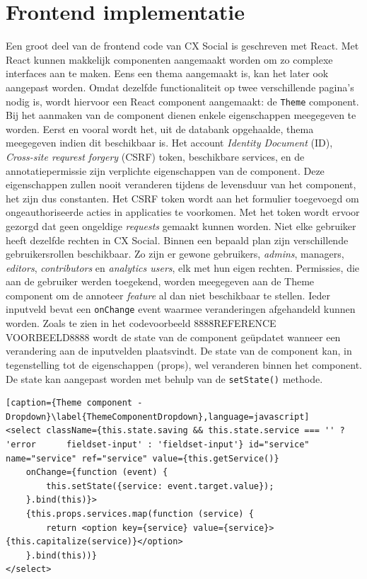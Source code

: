 \section{Frontend implementatie}
Een groot deel van de frontend code van CX Social is geschreven met React. Met React kunnen makkelijk componenten aangemaakt worden om zo complexe interfaces aan te maken. %
Eens een thema aangemaakt is, kan het later ook aangepast worden. Omdat dezelfde functionaliteit op twee verschillende pagina's nodig is, wordt hiervoor een React component aangemaakt: de \lstinline{Theme} component. Bij het aanmaken van de component dienen enkele eigenschappen meegegeven te worden. Eerst en vooral wordt het, uit de databank opgehaalde, thema meegegeven indien dit beschikbaar is. %
Het account \textit{Identity Document} (ID), \textit{Cross-site requrest forgery} (CSRF) token, beschikbare services, en de annotatiepermissie zijn verplichte eigenschappen van de component. Deze eigenschappen zullen nooit veranderen tijdens de levensduur van het component, het zijn dus constanten. Het CSRF token wordt aan het formulier toegevoegd om ongeauthoriseerde acties in applicaties te voorkomen. Met het token wordt ervoor gezorgd dat geen ongeldige \textit{requests} gemaakt kunnen worden. %
Niet elke gebruiker heeft dezelfde rechten in CX Social. Binnen een bepaald plan zijn verschillende gebruikersrollen beschikbaar. Zo zijn er gewone gebruikers, \textit{admins}, managers, \textit{editors}, \textit{contributors} en \textit{analytics users}, elk met hun eigen rechten. Permissies, die aan de gebruiker werden toegekend, worden meegegeven aan de Theme component om de annoteer \textit{feature} al dan niet beschikbaar te stellen. Ieder inputveld bevat een \lstinline{onChange} event waarmee veranderingen afgehandeld kunnen worden. Zoals te zien in het codevoorbeeld 8888REFERENCE VOORBEELD8888 wordt de state van de component ge\"{u}pdatet wanneer een verandering aan de inputvelden plaatsvindt. De state van de component kan, in tegenstelling tot de eigenschappen (props), wel veranderen binnen het component. De state kan aangepast worden met behulp van  de \lstinline{setState()} methode. 

\begin{lstlisting}[caption={Theme component - Dropdown}\label{ThemeComponentDropdown},language=javascript]
<select className={this.state.saving && this.state.service === '' ? 'error 		fieldset-input' : 'fieldset-input'} id="service" name="service" ref="service" value={this.getService()}
	onChange={function (event) {
		this.setState({service: event.target.value});
	}.bind(this)}>
	{this.props.services.map(function (service) {
		return <option key={service} value={service}>{this.capitalize(service)}</option>
	}.bind(this))}
</select>
\end{lstlisting}

